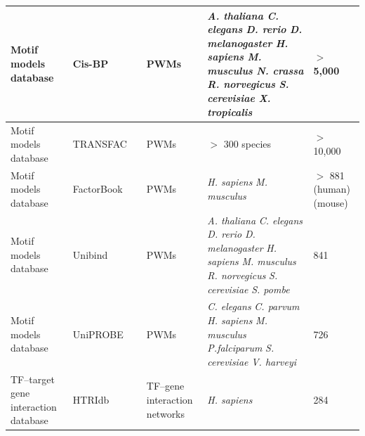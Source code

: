 \documentclass[a4paper, titlepage, openright]{book}
\begin{document}
\begin{longtable}{|p{2cm}|p{2cm}|p{3cm}|p{2cm}|p{4cm}|p{2cm}|}
		\hline
		Motif models database & Cis-BP & \citep{weirauch2014determination} & PWMs & \emph{A. thaliana} \newline \emph{C. elegans} \newline \emph{D. rerio}  \newline \emph{D. melanogaster} \newline \emph{H. sapiens} \newline \emph{M. musculus} \newline \emph{N. crassa} \newline \emph{R. norvegicus} \newline \emph{S. cerevisiae} \newline \emph{X. tropicalis} & $>$ 5,000 \\
		\hline
		Motif models database & TRANSFAC & \citep{wingender1996transfac, wingender2000transfac} & PWMs & $>$ 300 species & $>$ 10,000 \\
		\hline
		Motif models database & FactorBook & \citep{pratt2022factorbook} & PWMs & \emph{H. sapiens} \newline \emph{M. musculus}  & $>$ 881 (human) \newline 49 (mouse) \\
		\hline
		Motif models database & Unibind & \citep{puig2021unibind} & PWMs &\emph{A. thaliana} \newline \emph{C. elegans} \newline \emph{D. rerio}  \newline \emph{D. melanogaster} \newline \emph{H. sapiens} \newline \emph{M. musculus} \newline \emph{R. norvegicus} \newline \emph{S. cerevisiae} \newline \emph{S. pombe}  & 841 \\
		\hline
		Motif models database & UniPROBE & \citep{newburger2009uniprobe} & PWMs & \emph{C. elegans} \newline \emph{C. parvum} \newline \emph{H. sapiens} \newline \emph{M. musculus} \newline \emph{P.falciparum} \newline \emph{S. cerevisiae} \newline \emph{V. harveyi}  & 726 \\
		\hline
		TF–target gene interaction database  & HTRIdb & \citep{bovolenta2012htridb} & TF–gene interaction networks & \emph{H. sapiens} & 284 \\

\end{longtable}
\end{document}
